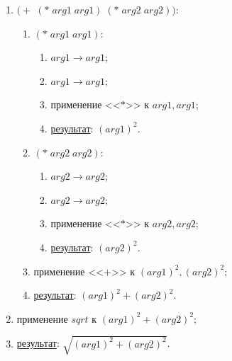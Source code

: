 \begin{enumerate}
	\item $\bigl(+\; (*\; arg1\; arg1)\; (*\; arg2\; arg2)\bigr)$:
	\begin{enumerate}
		\item $(*\; arg1\; arg1)$:
		\begin{enumerate}
			\item $arg1 \to arg1$;
			\item $arg1 \to arg1$;
			\item применение <<$*$>> к $arg1, arg1$;
			\item \underline{результат}: $(arg1)^2$.
		\end{enumerate}
		\item $(*\; arg2\; arg2)$:
		\begin{enumerate}
			\item $arg2 \to arg2$;
			\item $arg2 \to arg2$;
			\item применение <<$*$>> к $arg2, arg2$;
			\item \underline{результат}: $(arg2)^2$.
		\end{enumerate}
		\item применение <<$+$>> к $(arg1)^2, (arg2)^2$;
		\item \underline{результат}: $(arg1)^2 + (arg2)^2$.
	\end{enumerate}
	\item применение $sqrt$ к $(arg1)^2 + (arg2)^2$;
	\item \underline{результат}: $\sqrt{(arg1)^2 + (arg2)^2}$.
\end{enumerate}